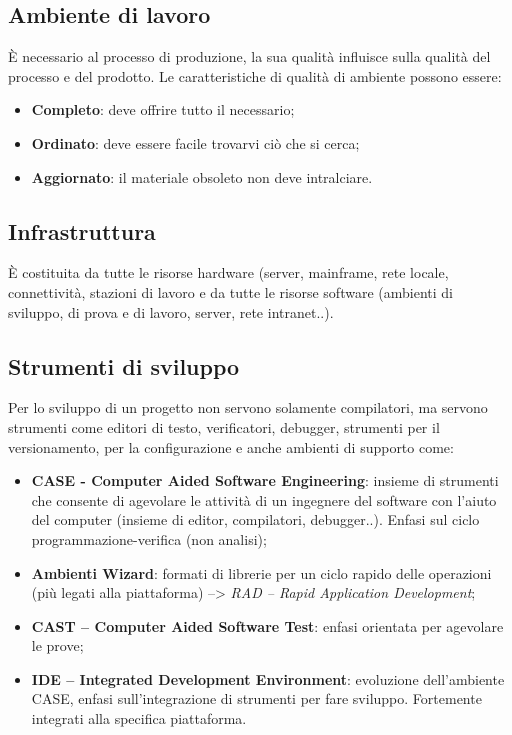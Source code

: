 \subsection{Ambiente di lavoro}
\`E necessario al processo di produzione, la sua qualità influisce sulla qualità del processo e del prodotto. 
Le caratteristiche di qualità di ambiente possono essere:
\begin{itemize}
\item \textbf{Completo}: deve offrire tutto il necessario;
\item \textbf{Ordinato}: deve essere facile trovarvi ciò che si cerca;
\item \textbf{Aggiornato}: il materiale obsoleto non deve intralciare.
\end{itemize}

\subsection{Infrastruttura}
\`E costituita da tutte le risorse hardware (server, mainframe, rete locale, connettività, stazioni di lavoro e da tutte le risorse software (ambienti di sviluppo, di prova e di lavoro, server, rete intranet..).

\subsection{Strumenti di sviluppo}
Per lo sviluppo di un progetto non servono solamente compilatori, ma servono strumenti come editori di testo, verificatori, debugger, strumenti per il versionamento, per la configurazione e anche ambienti di supporto come:
\begin{itemize}
\item \textbf{CASE - Computer Aided Software Engineering}: insieme di strumenti che consente di agevolare le attività di un ingegnere del software con l'aiuto del computer (insieme di editor, compilatori, debugger..). Enfasi sul ciclo programmazione-verifica (non analisi);
\item \textbf{Ambienti Wizard}: formati di librerie per un ciclo rapido delle operazioni (più legati alla piattaforma) --> \textit{RAD – Rapid Application Development};
\item \textbf{CAST – Computer Aided Software Test}: enfasi orientata per agevolare le prove;
\item \textbf{IDE – Integrated Development Environment}: evoluzione dell'ambiente CASE, enfasi sull'integrazione di strumenti per fare sviluppo. Fortemente integrati alla specifica piattaforma.
\end{itemize}

